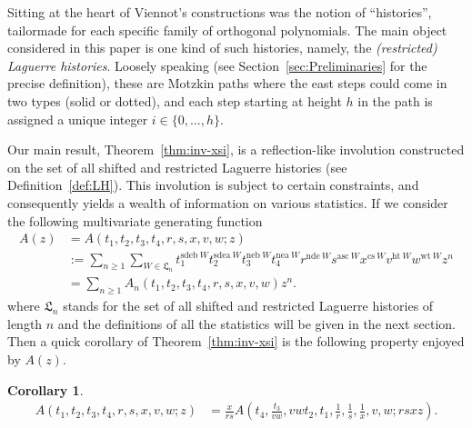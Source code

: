 \documentclass[12pt]{amsart}
\numberwithin{equation}{section}
\theoremstyle{plain}
\newtheorem{corollary}[theorem]{Corollary}
\theoremstyle{definition}
\def\LH{\mathfrak{L}}
\def\cs{\mathrm{cs}}
\def\neb{\mathrm{neb}}
\def\nea{\mathrm{nea}}
\def\sdeb{\mathrm{sdeb}}
\def\sdea{\mathrm{sdea}}
\def\nde{\mathrm{nde}}
\def\het{\mathrm{ht}}
\def\wt{\mathrm{wt}}
\def\asc{\mathrm{asc}}
\begin{document}
Sitting at the heart of Viennot's constructions was the notion of ``histories'', tailormade for each specific family of orthogonal polynomials. The main object considered in this paper is one kind of such histories, namely, the {\em (restricted) Laguerre histories}. Loosely speaking (see Section~\ref{sec:Preliminaries} for the precise definition), these are Motzkin paths where the east steps could come in two types (solid or dotted), and each step starting at height $h$ in the path is assigned a unique integer $i\in\{0,\ldots, h\}$.

Our main result, Theorem~\ref{thm:inv-xsi}, is a reflection-like involution constructed on the set of all shifted and restricted Laguerre histories (see Definition~\ref{def:LH}). This involution is subject to certain constraints, and consequently yields a wealth of information on various statistics. If we consider the following multivariate generating function
\begin{align}\label{gf:A}
A(z)&=A(t_1,t_2,t_3,t_4,r,s,x,v,w;z)\\
&:=\sum_{n\ge 1}\sum_{W\in\LH_n}t_1^{\sdeb\:W}t_2^{\sdea\:W}t_3^{\neb\:W}t_4^{\nea\:W}r^{\nde\:W}s^{\asc\:W}x^{\cs\:W}v^{\het\:W}w^{\wt\:W}z^n \nonumber\\
&=\sum_{n\ge 1}A_n(t_1,t_2,t_3,t_4,r,s,x,v,w)z^n. \nonumber
\end{align}
where $\LH_n$ stands for the set of all shifted and restricted Laguerre histories of length $n$ and the definitions of all the statistics will be given in the next section. Then a quick corollary of Theorem~\ref{thm:inv-xsi} is the following property enjoyed by $A(z)$.
\begin{corollary}\label{coro:gf of A}
\begin{align}\label{eq:A var change}
A(t_1,t_2,t_3,t_4,r,s,x,v,w;z) &=
\frac{x}{rs} A(t_4,\frac{t_3}{vw},vwt_2,t_1,\frac{1}{r},\frac{1}{s},\frac{1}{x},v,w;rsxz).
\end{align}
\end{corollary}
\end{document}
